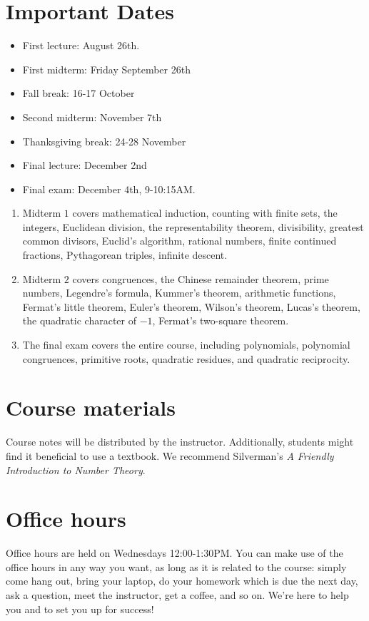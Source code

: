 \documentclass{article}
\begin{document}
\section*{Important Dates}
\begin{itemize}
\item First lecture: August 26th.
\item First midterm: Friday September 26th
\item Fall break: 16-17 October
\item Second midterm: November 7th
\item Thanksgiving break: 24-28 November
\item Final lecture: December 2nd
\item Final exam: December 4th, 9-10:15AM.
\end{itemize}

\begin{enumerate}
\item Midterm $1$ covers mathematical induction, counting with finite sets, the integers, Euclidean division, the representability theorem, divisibility, greatest common divisors, Euclid's algorithm, rational numbers, finite continued fractions, Pythagorean triples, infinite descent.
\item Midterm $2$ covers congruences, the Chinese remainder theorem, prime numbers, Legendre's formula, Kummer's theorem, arithmetic functions, Fermat's little theorem, Euler's theorem, Wilson's theorem, Lucas's theorem, the quadratic character of $-1$, Fermat's two-square theorem.
\item The final exam covers the entire course, including polynomials, polynomial congruences, primitive roots, quadratic residues, and quadratic reciprocity.
\end{enumerate}

\section*{Course materials}

Course notes will be distributed by the instructor. Additionally, students might find it beneficial to use a textbook. We recommend Silverman's \emph{A Friendly Introduction to Number Theory}. 

\section*{Office hours}

Office hours are held on Wednesdays 12:00-1:30PM. You can make use of the office hours in any way you want, as long as it is related to the course: simply come hang out, bring your laptop, do your homework which is due the next day, ask a question, meet the instructor, get a coffee, and so on. We're here to help you and to set you up for success!
\end{document}
